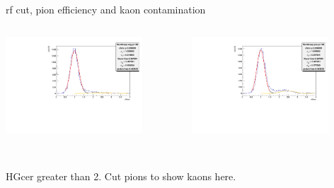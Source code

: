 \documentclass[aspectratio=169,xcolor=dvipsnames]{beamer}
\begin{document}
\begin{frame}{rf cut, pion efficiency and kaon contamination}
  \begin{columns}
    \begin{column}[T]{0.5\textwidth}
  \includegraphics[width = 0.8\textwidth]{results/pid/rftime/rftime_neg_180.pdf}
\end{column}
\begin{column}[T]{0.5\textwidth}
  \includegraphics[width = 0.8\textwidth]{results/pid/rftime/rftime_pos_180.pdf}
\end{column}
\end{columns}
\\
HGcer greater than 2. Cut pions to show kaons here.
\end{frame}
\end{document}
